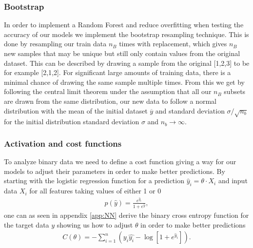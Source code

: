 \documentclass[11pt]{article}
\begin{document}
\subsubsection*{Bootstrap}

In order to implement a Random Forest and reduce overfitting when testing the accuracy of our models we implement the bootstrap resampling technique. This is done by resampling our train data $n_B$ times with replacement, which gives $n_B$ new samples that may be unique but still only contain values from the original dataset. This can be described by drawing a sample from the original [1,2,3] to be for example [2,1,2]. For significant large amounts of training data, there is a minimal chance of drawing the same sample multiple times. From this we get by following the central limit theorem \cite{limit} under the assumption that all our $n_B$ subsets are drawn from the same distribution, our new data to follow a normal distribution with the mean of the initial dataset $\overline{y}$ and standard deviation $\sigma/\sqrt{n_b}$ for the initial distribution standard deviation $\sigma$ and $n_b \rightarrow \infty$.
\subsubsection*{Activation and cost functions}
To analyze binary data we need to define a cost function giving a way for our models to adjust their parameters in order to make better predictions. By starting with the logistic regression function for a prediction $\hat{y}_i = \theta \cdot X_i$ and input data $X_i$ for all features taking values of either 1 or 0
\begin{align*}
    p(\hat{y}) = \frac{e^{\hat{y}_i}}{1 + e^{\hat{y}}},
\end{align*}
one can as seen in appendix \ref{app:NN} derive the binary cross entropy function for the target data $y$ showing us how to adjust $\theta$ in order to make better predictions
\begin{align*}
    C(\theta) = - \sum_{i=1}^n (y_i\hat{y_i} - \log[1+ e^{\hat{y}_i}]).
\end{align*}
\end{document}
